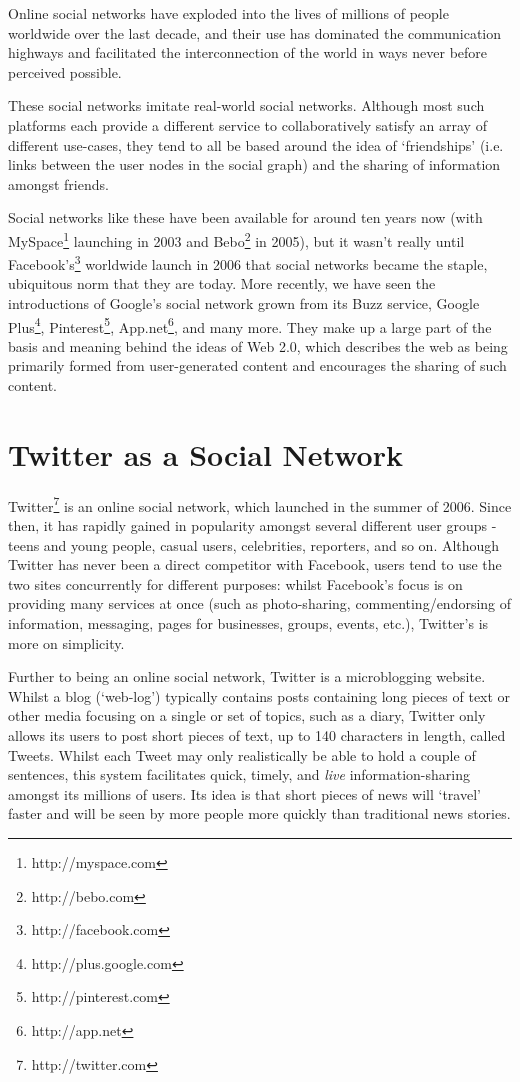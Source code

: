 Online social networks have exploded into the lives of millions of people worldwide over the last decade, and their use has dominated the communication highways and facilitated the interconnection of the world in ways never before perceived possible.

These social networks imitate real-world social networks. Although most such platforms each provide a different service to collaboratively satisfy an array of different use-cases, they tend to all be based around the idea of `friendships' (i.e. links between the user nodes in the social graph) and the sharing of information amongst friends.

Social networks like these have been available for around ten years now (with MySpace\footnote{http://myspace.com} launching in 2003 and Bebo\footnote{http://bebo.com} in 2005), but it wasn't really until Facebook's\footnote{http://facebook.com} worldwide launch in 2006 that social networks became the staple, ubiquitous norm that they are today. More recently, we have seen the introductions of Google's social network grown from its Buzz service, Google Plus\footnote{http://plus.google.com}, Pinterest\footnote{http://pinterest.com}, App.net\footnote{http://app.net}, and many more. They make up a large part of the basis and meaning behind the ideas of Web 2.0, which describes the web as being primarily formed from user-generated content and encourages the sharing of such content.


\section{Twitter as a Social Network}
Twitter\footnote{http://twitter.com} is an online social network, which launched in the summer of 2006. Since then, it has rapidly gained in popularity amongst several different user groups - teens and young people, casual users, celebrities, reporters, and so on. Although Twitter has never been a direct competitor with Facebook, users tend to use the two sites concurrently for different purposes: whilst Facebook's focus is on providing many services at once (such as photo-sharing, commenting/endorsing of information, messaging, pages for businesses, groups, events, etc.), Twitter's is more on simplicity.

Further to being an online social network, Twitter is a microblogging website. Whilst a blog (`web-log') typically contains posts containing long pieces of text or other media focusing on a single or set of topics, such as  a diary, Twitter only allows its users to post short pieces of text, up to 140 characters in length, called Tweets. Whilst each Tweet may only realistically be able to hold a couple of sentences, this system facilitates quick, timely, and \textit{live} information-sharing amongst its millions of users. Its idea is that short pieces of news will `travel' faster and will be seen by more people more quickly than traditional news stories.


